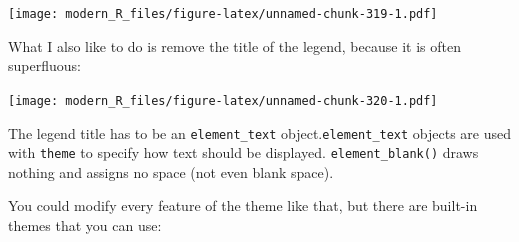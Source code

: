 \documentclass[]{gitbook}
\newenvironment{Shaded}{\begin{snugshade}}{\end{snugshade}}
\newcommand{\DataTypeTok}[1]{\textcolor[rgb]{0.13,0.29,0.53}{#1}}
\newcommand{\KeywordTok}[1]{\textcolor[rgb]{0.13,0.29,0.53}{\textbf{#1}}}
\newcommand{\NormalTok}[1]{#1}
\newcommand{\OperatorTok}[1]{\textcolor[rgb]{0.81,0.36,0.00}{\textbf{#1}}}
\newcommand{\StringTok}[1]{\textcolor[rgb]{0.31,0.60,0.02}{#1}}
\theoremstyle{definition}
\theoremstyle{definition}
\theoremstyle{definition}
\theoremstyle{remark}
\begin{document}
\texttt{[image: modern\_R\_files/figure-latex/unnamed-chunk-319-1.pdf]}

What I also like to do is remove the title of the legend, because it is
often superfluous:

\begin{Shaded}
\end{Shaded}

\texttt{[image: modern\_R\_files/figure-latex/unnamed-chunk-320-1.pdf]}

The legend title has to be an \texttt{element\_text}
object.\texttt{element\_text} objects are used with \texttt{theme} to
specify how text should be displayed. \texttt{element\_blank()} draws
nothing and assigns no space (not even blank space).

You could modify every feature of the theme like that, but there are
built-in themes that you can use:
\end{document}
